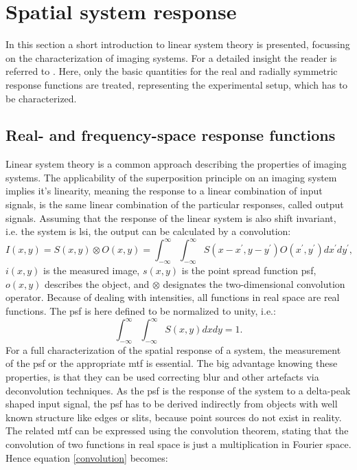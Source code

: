 \section{Spatial system response} \label{sec:ssr}
In this section a short introduction to linear system theory is presented, focussing on the characterization of imaging systems. For a detailed insight the reader is referred to \citep{Cunningham,Samei1998,Wagner1974,Wagner1977,Donath2007}. Here, only the basic quantities for the real and radially symmetric response functions are treated, representing the experimental setup, which has to be characterized.   
\subsection{Real- and frequency-space response functions } \label{subsec:ct} 
Linear system theory is a common approach describing the properties of imaging systems. 
The applicability of the superposition principle on an imaging system implies it's linearity, 
meaning the response to a linear combination of input signals, 
is the same linear combination of the particular responses, called output signals. 
Assuming that the response of the linear system is also shift invariant, i.e. the system is \gls{lsi}, 
the output can be calculated by a convolution: 
\begin{equation}\label{convolution}
I(x,y) = S(x,y) \otimes O(x,y) = \int_{-\infty}^{\infty}\int_{-\infty}^{\infty}S(x-x^{'},y-y^{'})O(x^{'},y^{'})dx^{'}dy^{'},
\end{equation}
$i(x,y)$ is the measured image, $s(x,y)$ is the point spread function \gls{psf}, $o(x,y)$ describes the object, 
and $\otimes$ designates the two-dimensional convolution operator. Because of dealing with intensities, 
all functions in real space are real functions. The \gls{psf} is here defined to be normalized to unity, i.e.:
\begin{equation}\label{norm}
\int_{-\infty}^{\infty}\int_{-\infty}^{\infty} S(x,y)dxdy = 1.
\end{equation} 
For a full characterization of the spatial response of a system, the measurement of the \gls{psf} or the appropriate \gls{mtf} is essential. The big advantage knowing these properties, is that they can be used correcting blur and other artefacts via deconvolution techniques. As the \gls{psf} is the response of the system to a delta-peak shaped input signal, the \gls{psf} has to be derived indirectly from objects with well known structure like edges or slits, because point sources do not exist in reality. The related \gls{mtf} can be expressed using the convolution theorem, stating that the convolution of two functions in real space is just a multiplication in Fourier space. Hence equation \ref{convolution} becomes: 
